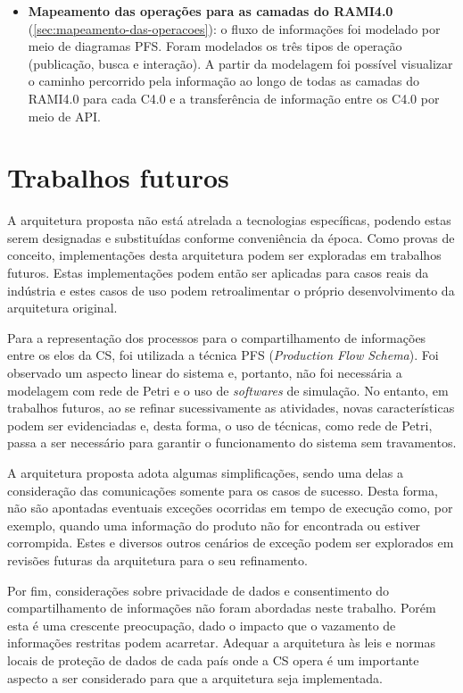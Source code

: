 \begin{itemize}
	\item \textbf{Mapeamento das operações para as camadas do RAMI4.0} (\autoref{sec:mapeamento-das-operacoes}): o fluxo de informações foi modelado por meio de diagramas PFS. Foram modelados os três tipos de operação (publicação, busca e interação). A partir da modelagem foi possível visualizar o caminho percorrido pela informação ao longo de todas as camadas do RAMI4.0 para cada C4.0 e a transferência de informação entre os C4.0 por meio de API.
\end{itemize}

\section{Trabalhos futuros}

A arquitetura proposta não está atrelada a tecnologias específicas, podendo estas serem designadas e substituídas conforme conveniência da época. Como provas de conceito, implementações desta arquitetura podem ser exploradas em trabalhos futuros. Estas implementações podem então ser aplicadas para casos reais da indústria e estes casos de uso podem retroalimentar o próprio desenvolvimento da arquitetura original.

Para a representação dos processos para o compartilhamento de informações entre os elos da CS, foi utilizada a técnica PFS (\textit{Production Flow Schema}). Foi observado um aspecto linear do sistema e, portanto, não foi necessária a modelagem com rede de Petri e o uso de \textit{softwares} de simulação. No entanto, em trabalhos futuros, ao se refinar sucessivamente as atividades, novas características podem ser evidenciadas e, desta forma, o uso de técnicas, como rede de Petri, passa a ser necessário para garantir o funcionamento do sistema sem travamentos.

A arquitetura proposta adota algumas simplificações, sendo uma delas a consideração das comunicações somente para os casos de sucesso. Desta forma, não são apontadas eventuais exceções ocorridas em tempo de execução como, por exemplo, quando uma informação do produto não for encontrada ou estiver corrompida. Estes e diversos outros cenários de exceção podem ser explorados em revisões futuras da arquitetura para o seu refinamento.

Por fim, considerações sobre privacidade de dados e consentimento do compartilhamento de informações não foram abordadas neste trabalho. Porém esta é uma crescente preocupação, dado o impacto que o vazamento de informações restritas podem acarretar. Adequar a arquitetura às leis e normas locais de proteção de dados de cada país onde a CS opera é um importante aspecto a ser considerado para que a arquitetura seja implementada.
